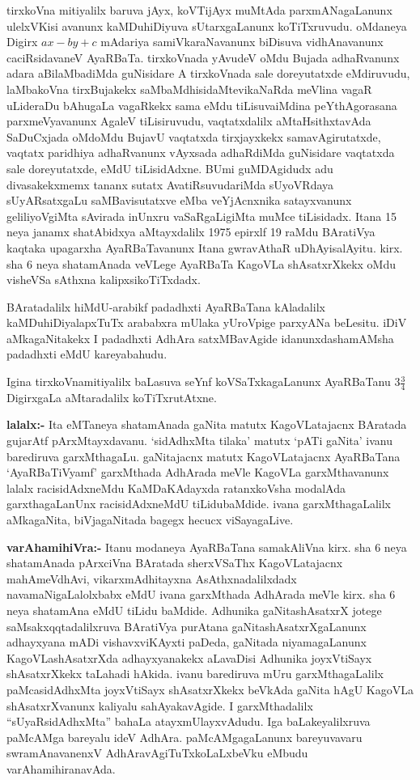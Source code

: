 tirxkoVna mitiyalilx baruva jAyx, koVTijAyx muMtAda parxmANagaLanunx ulelxVKisi avanunx kaMDuhiDiyuva sUtarxgaLanunx koTiTxruvudu. oMdaneya Digirx $ax-by+c$ mAdariya samiVkaraNavanunx biDisuva vidhAnavanunx caciRsidavaneV AyaRBaTa. tirxkoVnada yAvudeV oMdu Bujada adhaRvanunx adara aBilaMbadiMda guNisidare A tirxkoVnada sale doreyutatxde eMdiruvudu, laMbakoVna tirxBujakekx saMbaMdhisidaMte\break vikaNaRda  meVlina vagaR uLideraDu bAhugaLa vagaRkekx sama eMdu tiLisuva\break iMdina peYthAgorasana parxmeVyavanunx AgaleV tiLisiruvudu, vaqtatxdalilx aMtaHsithxtavAda SaDuCxjada oMdoMdu BujavU vaqtatxda tirxjayxkekx samavAgirutatxde, vaqtatx paridhiya adhaRvanunx vAyxsada adhaRdiMda guNisidare vaqtatxda sale doreyutatxde, eMdU tiLisidAdxne. BUmi guMDAgidudx adu divasakekxmemx tananx sutatx AvatiRsuvudariMda sUyoVRdaya sUyARsatxgaLu saMBavisutatxve eMba veYjAcnxnika satayxvanunx geliliyoVgiMta sAvirada inUnxru vaSaRgaLigiMta muMce tiLisidadx. Itana {\rm 15} neya janamx shatAbidxya aMtayxdalilx {\rm 1975} epirxlf {\rm 19} raMdu BAratiVya kaqtaka upagarxha AyaRBaTavanunx Itana gwravAthaR uDhAyisalAyitu. kirx. sha {\rm 6} neya shatamAnada veVLege AyaRBaTa KagoVLa shAsatxrXkekx oMdu visheVSa sAthxna kalipxsikoTiTxdadx.

BAratadalilx hiMdU-arabikf padadhxti AyaRBaTana kAladalilx kaMDuhiDiyalapxTuTx arababxra mUlaka yUroVpige parxyANa beLesitu. iDiV aMkagaNitakekx I padadhxti AdhAra satxMBavAgide idanunxdashamAMsha padadhxti eMdU kareyabahudu.

Igina tirxkoVnamitiyalilx baLasuva seYnf koVSaTxkagaLanunx AyaRBaTanu $3\frac{3}{4}$ \break DigirxgaLa aMtaradalilx koTiTxrutAtxne.

\textbf{lalalx:-} Ita eMTaneya shatamAnada gaNita matutx KagoVLatajacnx BAratada guja\-rAtf pArxMtayxdavanu. `sidAdhxMta tilaka' matutx `pATi gaNita' ivanu barediruva garxMthagaLu. gaNitajacnx matutx KagoVLatajacnx AyaRBaTana `AyaRBaTiVyamf' garxMthada AdhA\-rada meVle KagoVLa garxMthavanunx lalalx racisidAdxneMdu KaMDaKAdayxda ratanxkoVsha modalAda garxthagaLanUnx racisidAdxneMdU tiLidubaMdide. ivana garxMthagaLalilx aMkagaNita, biVja\-gaNitada bagegx hecucx viSayagaLive.

\textbf{varAhamihiVra:-} Itanu modaneya AyaRBaTana samakAliVna kirx. sha {\rm 6} neya shatamAnada pArxciVna BAratada sherxVSaThx KagoVLatajacnx mahAmeVdhAvi, vikarxmAdhitayxna AsAthxnadalilxdadx navamaNigaLalolxbabx eMdU ivana garxMthada AdhArada meVle kirx. sha {\rm 6} neya shatamAna eMdU tiLidu baMdide. Adhunika gaNitashAsatxrX jotege saMsakxqqtadalilxruva BAra\-tiVya purAtana gaNitashAsatxrXgaLanunx adhayxyana mADi vishavxviKAyxti paDeda, gaNitada niyama\-gaLanunx KagoVLashAsatxrXda adhayxyanakekx aLavaDisi Adhunika joyxVtiSayx shAsatxrXkekx taLahadi hAkida. ivanu barediruva mUru garxMthagaLalilx paMcasidAdhxMta joyxVtiSayx shAsatxrXkekx beVkAda gaNita hAgU KagoVLa shAsatxrXvanunx kaliyalu sahAyakavAgide. I garxMthadalilx ``sUyaRsidAdhxMta'' bahaLa atayxmUlayxvAdudu. Iga baLakeyalilxruva paMcAMga bareyalu ideV AdhAra. paMcAMgagaLanunx bareyuvavaru swramAnavanenxV AdhAravAgiTuTxkoLaLxbeVku eMbudu varAhamihiranavAda.

